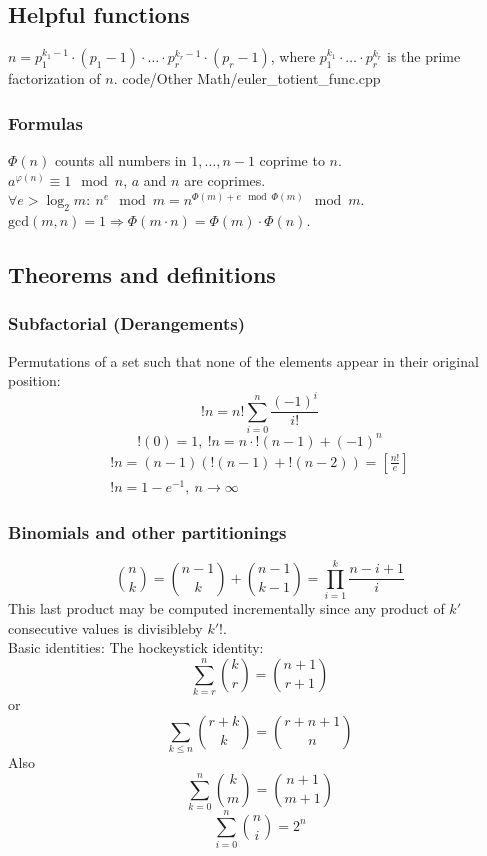 \documentclass[
	a4paper,
	landscape,
	10pt,
]{article}
\begin{document}
\begin{multicols}{3}
	\subsection{Helpful functions}
		{
			$n = p_1^{k_1-1}\cdot(p_1-1) \cdot \hdots \cdot p_r^{k_r-1}\cdot(p_r-1)$, where $p_1^{k_1} \cdot \hdots \cdot p_r^{k_r}$ is the prime factorization of $n$.
		}
		{code/Other Math/euler_totient_func.cpp}
		\subsubsection*{Formulas}
			$\Phi(n)$ counts all numbers in ${1,\hdots,n-1}$ coprime to $n$. \\
			$a^{\varphi (n)} \equiv 1 \mod n$, $a$ and $n$ are coprimes. \\
			$\forall e > \log_2 m:~ n^e \mod m = n^{\Phi(m) + e \mod \Phi(m)} \mod m$. \\
			$\text{gcd}(m,n) = 1 \Rightarrow \Phi(m\cdot n) = \Phi(m) \cdot \Phi(n)$. \\


	\subsection{Theorems and definitions}
		\subsubsection*{Subfactorial (Derangements)}
		Permutations of a set such that none of the elements appear in
		their original position:
		$$!n = n! \sum_{i=0}^{n} \frac{(-1)^i}{i!}$$
		$$!(0) = 1, ~ !n = n \cdot !(n-1) + (-1)^n$$
		\begin{gather}
			!n = (n-1)(!(n-1)+!(n-2)) = \left[\frac{n!}{e}\right] \\
			!n = 1-e^{-1},~n\rightarrow\infty
		\end{gather}

		\subsubsection*{Binomials and other partitionings}
		$$\binom{n}{k} = \binom{n-1}{k}+\binom{n-1}{k-1} =
			\prod_{i=1}^k \frac{n-i+1}{i}$$ This last product may be computed
		incrementally since any product of $k'$ consecutive values is divisibleby
		$k'!$. \\
		Basic identities: The hockeystick identity: \\
		 $$\sum_{k=r}^n \binom{k}{r}
			= \binom{n+1}{r+1}$$
		or $$\sum_{k\leq n}\binom{r+k}{k} = \binom{r+n+1}{n}$$
		Also $$\sum_{k=0}^n \binom{k}{m} = \binom{n+1}{m+1}$$
		$$\sum_{i=0}^{n} \binom{n}{i} = 2^n$$


\end{multicols}
\end{document}
